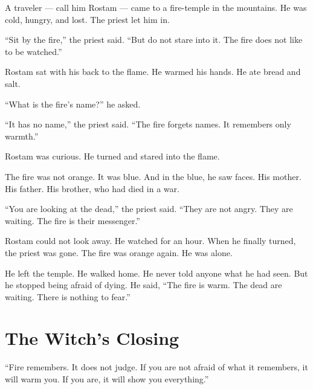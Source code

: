 \documentclass[10pt,twoside]{book}
\begin{document}
A traveler --- call him Rostam --- came to a fire-temple in the mountains. He was cold, hungry, and lost. The priest let him in.

``Sit by the fire,'' the priest said. ``But do not stare into it. The fire does not like to be watched.''

Rostam sat with his back to the flame. He warmed his hands. He ate bread and salt.

``What is the fire's name?'' he asked.

``It has no name,'' the priest said. ``The fire forgets names. It remembers only warmth.''

Rostam was curious. He turned and stared into the flame.

The fire was not orange. It was blue. And in the blue, he saw faces. His mother. His father. His brother, who had died in a war.

``You are looking at the dead,'' the priest said. ``They are not angry. They are waiting. The fire is their messenger.''

Rostam could not look away. He watched for an hour. When he finally turned, the priest was gone. The fire was orange again. He was alone.

He left the temple. He walked home. He never told anyone what he had seen. But he stopped being afraid of dying. He said, ``The fire is warm. The dead are waiting. There is nothing to fear.''

\section*{The Witch's Closing}
``Fire remembers. It does not judge. If you are not afraid of what it remembers, it will warm you. If you are, it will show you everything.''
\end{document}
